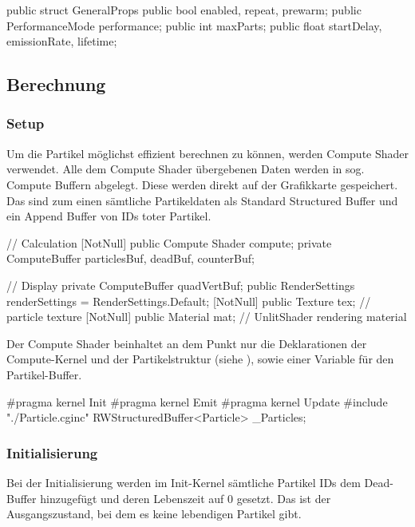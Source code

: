 \begin{csh}[caption=Partikel Struktur]
public struct GeneralProps
{
    public bool enabled, repeat, prewarm;
    public PerformanceMode performance;
    public int maxParts;
    public float startDelay, emissionRate, lifetime;
}
\end{csh}



\subsection{Berechnung}


\subsubsection{Setup}

Um die Partikel möglichst effizient berechnen zu können, werden Compute Shader verwendet. Alle dem Compute Shader übergebenen Daten werden in sog. Compute Buffern abgelegt. Diese werden direkt auf der Grafikkarte gespeichert. Das sind zum einen sämtliche Partikeldaten als Standard Structured Buffer und ein Append Buffer von IDs toter Partikel.

\begin{csh}[caption=Controller Setup,label=lst:partSetup]
// Calculation
[NotNull] public Compute Shader compute;
private ComputeBuffer particlesBuf, deadBuf, counterBuf;

// Display
private ComputeBuffer quadVertBuf;
public RenderSettings renderSettings = RenderSettings.Default;
[NotNull] public Texture tex;  // particle texture
[NotNull] public Material mat; // UnlitShader rendering material
\end{csh}

Der Compute Shader beinhaltet an dem Punkt nur die Deklarationen der Compute-Kernel und der Partikelstruktur (siehe ), sowie einer Variable für den Partikel-Buffer.

\begin{hlsl}[caption=Compute Setup]
#pragma kernel Init
#pragma kernel Emit
#pragma kernel Update
#include "./Particle.cginc"
RWStructuredBuffer<Particle> _Particles;
\end{hlsl}

\subsubsection{Initialisierung}

Bei der Initialisierung werden im Init-Kernel sämtliche Partikel IDs dem Dead-Buffer hinzugefügt und deren Lebenszeit auf 0 gesetzt. Das ist der Ausgangszustand, bei dem es keine lebendigen Partikel gibt.

